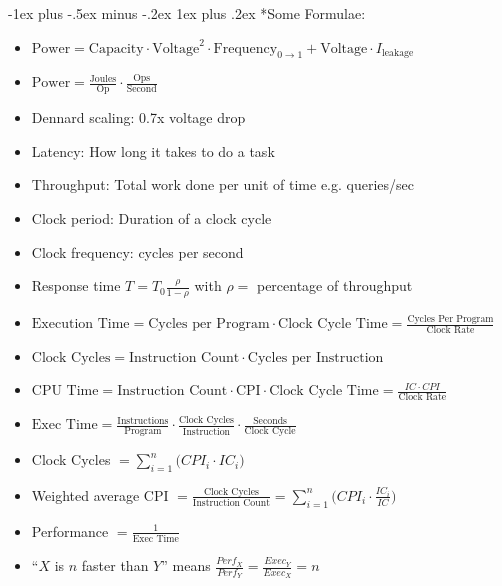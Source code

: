 \documentclass[landscape,10pt]{article}
\makeatletter
\renewcommand{\subsubsection}{\@startsection{subsubsection}{3}{0mm}%
            {-1ex plus -.5ex minus -.2ex}%
            {1ex plus .2ex}%
            {\normalfont\small\bfseries}}
\makeatother
\begin{document}
\footnotesize
\begin{multicols}{4}
\setlength{\premulticols}{1pt}
\setlength{\postmulticols}{1pt}
\setlength{\multicolsep}{1pt}
\setlength{\columnsep}{2pt}
\subsubsection*{Some Formulae:}
\begin{itemize}
    \item[] \(\text{Power} = \text{Capacity} \cdot \text{Voltage}^2 \cdot \text{Frequency}_{0 \rightarrow 1} + \text{Voltage}\cdot I_{\text{leakage}}\)
    \item[] \(\text{Power} = \frac{\text{Joules}}{\text{Op}} \cdot \frac{\text{Ops}}{\text{Second}}\)
    \item[] Dennard scaling: 0.7x voltage drop 
    \item[] Latency: How long it takes to do a task
    \item[] Throughput: Total work done per unit of time e.g. queries/sec
    \item[] Clock period: Duration of a clock cycle
    \item[] Clock frequency: cycles per second
    \item[] Response time \(T = T_0 \frac{\rho}{1-\rho}\) with \(\rho = \) percentage of throughput
    \item[] \(\text{Execution Time} = \text{Cycles per Program} \cdot \text{Clock Cycle Time} = \frac{\text{Cycles Per Program}}{\text{Clock Rate}}\)
    \item[] \(\text{Clock Cycles} = \text{Instruction Count} \cdot \text{Cycles per Instruction}\)
    \item[] \(\text{CPU Time} = \text{Instruction Count} \cdot \text{CPI} \cdot \text{Clock Cycle Time} = \frac{IC \cdot CPI}{\text{Clock Rate}}\)
    \item[] \(\text{Exec Time} = \frac{\text{Instructions}}{\text{Program}} \cdot \frac{\text{Clock Cycles}}{\text{Instruction}} \cdot \frac{\text{Seconds}}{\text{Clock Cycle}}\)
    \item[] Clock Cycles \(= \sum \limits_{i = 1}^{n} \big ( CPI_i \cdot IC_i \big) \)
    \item[] Weighted average CPI \(= \frac{\text{Clock Cycles}}{\text{Instruction Count}} = \sum \limits_{i=1}^{n} \Big ( CPI_i \cdot \frac {IC_i}{IC} \Big ) \)
    \item[] Performance \(= \frac{1}{\text{Exec Time}}\)
    \item[] ``\(X\) is \(n\) faster than \(Y\)'' means \(\frac{Perf_X}{Perf_Y} = \frac{Exec_Y}{Exec_X} = n\)

\end{itemize}
\end{multicols}
\end{document}
